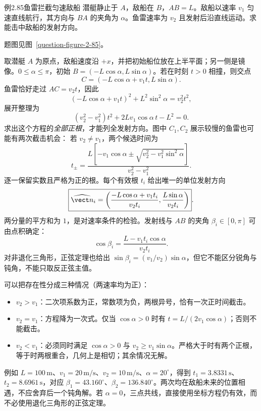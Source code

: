 \begin{origexamplebox}{例2.85\quad 鱼雷拦截匀速敌船}
潜艇静止于 $A$，敌船在 $B$，$AB=L$。敌船以速率 $v_1$ 匀速直线航行，其方向与 $BA$ 的夹角为 $\alpha$。鱼雷速率为 $v_2$ 且发射后沿直线运动。求能击中敌船的发射方向。
\par 题图见图~\ref{question-figure-2-85}。
\KQuestionDH
\end{origexamplebox}
\begin{xesolution}
取潜艇 $A$ 为原点，敌船速度沿 $+x$，并把初始船位放在上半平面；另一侧是镜像。$0\le\alpha\le\pi$，初始 $B=(-L\cos\alpha,L\sin\alpha)$。若在时刻 $t>0$ 相撞，则交点
\[
C=(-L\cos\alpha+v_1t,L\sin\alpha).
\]
鱼雷恰好走过 $AC=v_2t$，因此
\[
(-L\cos\alpha+v_1t)^2+L^2\sin^2\alpha=v_2^2t^2,
\]
展开整理为
\[
\boxed{(v_2^2-v_1^2)t^2+2Lv_1\cos\alpha\,t-L^2=0}.
\]
求出这个方程的\emph{全部正根}，才能列全发射方向。图中 $C_1,C_2$ 展示较慢的鱼雷也可能有两次截击机会：
\InterceptTriangleDiagram
若 $v_2\ne v_1$，两个候选时间为
\[
t_{\pm}=\frac{L[-v_1\cos\alpha\pm\sqrt{v_2^2-v_1^2\sin^2\alpha}]}{v_2^2-v_1^2}.
\]
逐一保留实数且严格为正的根。每个有效根 $t_i$ 给出唯一的单位发射方向
\[
\boxed{\widehat{\vect n}_i=
\left(\frac{-L\cos\alpha+v_1t_i}{v_2t_i},
\frac{L\sin\alpha}{v_2t_i}\right)}.
\]
两分量的平方和为 $1$，是对速率条件的检验。发射线与 $AB$ 的夹角 $\beta_i\in[0,\pi]$ 可由点积确定：
\[
\cos\beta_i=\frac{L-v_1t_i\cos\alpha}{v_2t_i}.
\]
对非退化三角形，正弦定理也给出 $\sin\beta_i=(v_1/v_2)\sin\alpha$，但它不能区分锐角与钝角，不能只取反正弦主值。

可以把存在性分成三种情况（两速率均为正）：
\begin{itemize}
\item $v_2>v_1$：二次项系数为正，常数项为负，两根异号，恰有一次正时间截击。
\item $v_2=v_1$：方程降为一次式。仅当 $\cos\alpha>0$ 时有 $t=L/(2v_1\cos\alpha)$；否则不能截击。
\item $v_2<v_1$：必须同时满足 $\cos\alpha>0$ 与 $v_2\ge v_1\sin\alpha$。严格大于时有两个正根，等于时两根重合，几何上是相切；其余情况无解。
\end{itemize}
例如 $L=100\,\mathrm m$、$v_1=20\,\mathrm{m/s}$、$v_2=10\,\mathrm{m/s}$、$\alpha=20^\circ$，得到 $t_1=3.8331\,\mathrm s$、$t_2=8.6961\,\mathrm s$，对应 $\beta_1=43.160^\circ$、$\beta_2=136.840^\circ$。两次均在敌船未来的位置相遇，不应舍弃后一个钝角解。若 $\alpha=0$，三点共线，直接使用坐标方程仍有效，而不必使用退化三角形的正弦定理。
\end{xesolution}

